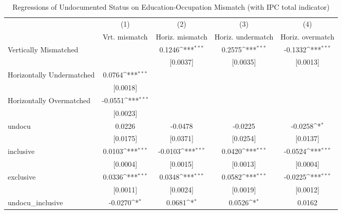 \begin{table}[htbp]\centering
\def\sym#1{\ifmmode^{#1}\else\(^{#1}\)\fi}
\caption{Regressions of Undocumented Status on Education-Occupation Mismatch (with IPC total indicator)}
\begin{tabular}{l*{4}{c}}
\toprule
                    &\multicolumn{1}{c}{(1)}         &\multicolumn{1}{c}{(2)}         &\multicolumn{1}{c}{(3)}         &\multicolumn{1}{c}{(4)}         \\
                    &Vrt. mismatch         &Horiz. mismatch         &Horiz. undermatch         &Horiz. overmatch         \\
\midrule
Vertically Mismatched&                     &      0.1246\sym{***}&      0.2575\sym{***}&     -0.1332\sym{***}\\
                    &                     &    [0.0037]         &    [0.0035]         &    [0.0013]         \\
\addlinespace
Horizontally Undermatched&      0.0764\sym{***}&                     &                     &                     \\
                    &    [0.0018]         &                     &                     &                     \\
\addlinespace
Horizontally Overmatched&     -0.0551\sym{***}&                     &                     &                     \\
                    &    [0.0023]         &                     &                     &                     \\
\addlinespace
undocu              &      0.0226         &     -0.0478         &     -0.0225         &     -0.0258\sym{*}  \\
                    &    [0.0175]         &    [0.0371]         &    [0.0254]         &    [0.0137]         \\
\addlinespace
inclusive           &      0.0103\sym{***}&     -0.0103\sym{***}&      0.0420\sym{***}&     -0.0524\sym{***}\\
                    &    [0.0004]         &    [0.0015]         &    [0.0013]         &    [0.0004]         \\
\addlinespace
exclusive           &      0.0336\sym{***}&      0.0348\sym{***}&      0.0582\sym{***}&     -0.0225\sym{***}\\
                    &    [0.0011]         &    [0.0024]         &    [0.0019]         &    [0.0012]         \\
\addlinespace
undocu\_inclusive    &     -0.0270\sym{*}  &      0.0681\sym{*}  &      0.0526\sym{*}  &      0.0162         \\

\end{tabular}
\end{table}
